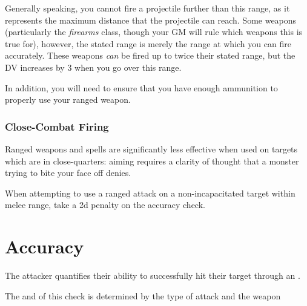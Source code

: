 Generally speaking, you cannot fire a projectile further than this range, as it represents the maximum distance that the projectile can reach. Some weapons (particularly the {\it firearms} class, though your GM will rule which weapons this is true for), however, the stated range is merely the range at which you can fire accurately. These weapons {\it can} be fired up to twice their stated range, but the DV increases by 3 when you go over this range.

In addition, you will need to ensure that you have enough ammunition to properly use your ranged weapon.


\subsubsection{Close-Combat Firing}

Ranged weapons and spells are significantly less effective when used on targets which are in close-quarters: aiming requires a clarity of thought that a monster trying to bite your face off denies. 

When attempting to use a ranged attack on a non-incapacitated target within melee range, take a 2d penalty on the accuracy check.

\section{Accuracy}

The attacker quantifies their ability to successfully hit their target through an . 

The  and  of this check is determined by the type of attack and the weapon 







